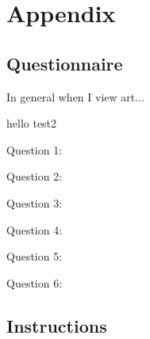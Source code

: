 \documentclass[../main.tex]{subfiles}
\begin{document}
\section{Appendix}
	\subsection{Questionnaire}
	In general when I view art...
	
	\begin{table}
		hello
		test2
	\end{table}
	Question 1:
	
	Question 2:
	
	Question 3:
	
	Question 4:
	
	Question 5:
	
	Question 6:
	
	\subsection{Instructions}
	
\end{document}
